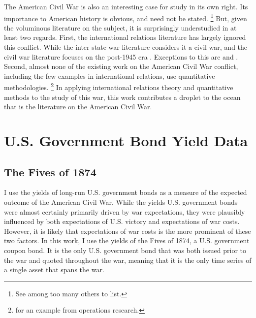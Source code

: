 The American Civil War is also an interesting case for study in its own right.
Its importance to American history is obvious, and need not be stated.%
\footnote{See \textcite{McPherson2003} among too many others to list.}
But, given the voluminous literature on the subject, it is surprisingly understudied in at least two regards. %
First, the international relations literature has largely ignored this conflict.
While the inter-state war literature considers it a civil war, and the civil war literature focuses on the post-1945 era \parencites[140-141]{Reiter2009}[2]{Poast2012}. %
Exceptions to this are \textcite{Reiter2009} and \textcite{Poast2012}.
Second, almost none of the existing work on the American Civil War conflict, including the few examples in international relations, use quantitative methodologies.%
\footnote{\textcite{Weiss1966} for an example from operations research.}
In applying international relations theory and quantitative methods to the study of this war, this work contributes a droplet to the ocean that is the literature on the American Civil War.



\section{U.S. Government Bond Yield Data}
\label{sec:why-prices-study}



\subsection{The Fives of 1874}
\label{sec:5s-1874}

I use the yields of long-run U.S. government bonds as a measure of the expected outcome of the American Civil War.
While the yields U.S. government bonds were almost certainly primarily driven by war expectations, they were plausibly influenced by both expectations of U.S. victory and expectations of war costs.
However, it is likely that expectations of war costs is the more prominent of these two factors.
In this work, I use the yields of the Fives of 1874, a U.S. government coupon bond.
It is the only U.S. government bond that was both issued prior to the war and quoted throughout the war, meaning that it is the only time series of a single asset that spans the war.

